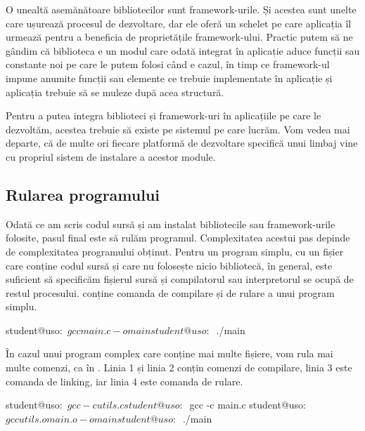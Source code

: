 O unealtă asemănătoare bibliotecilor sunt framework-urile. Și acestea sunt
unelte care ușurează procesul de dezvoltare, dar ele oferă un schelet pe care
aplicația îl urmează pentru a beneficia de proprietățile framework-ului. Practic
putem să ne gândim că biblioteca e un modul care odată integrat în aplicație
aduce funcții sau constante noi pe care le putem folosi când e cazul, în timp ce
framework-ul impune anumite funcții sau elemente ce trebuie implementate în
aplicație și aplicația trebuie să se muleze după acea structură.

Pentru a putea integra biblioteci și framework-uri în aplicațiile pe care le
dezvoltăm, acestea trebuie să existe pe sistemul pe care lucrăm. Vom vedea mai
departe, că de multe ori fiecare platformă de dezvoltare specifică unui limbaj
vine cu propriul sistem de instalare a acestor module.

\subsection{Rularea programului}
\label{sec:appdev:dev:run}

Odată ce am scris codul sursă și am instalat bibliotecile sau framework-urile
folosite, pasul final este să rulăm programul. Complexitatea acestui pas depinde
de complexitatea programului obținut. Pentru un program simplu, cu un fișier
care conține codul sursă și care nu folosește nicio bibliotecă, în general, este
suficient să specificăm fișierul sursă și compilatorul sau interpretorul se
ocupă de restul procesului.  conține comanda de compilare și de rulare a unui program simplu.

\begin{screen}[caption={Compilarea și rularea unui program simplu},label={lst:appdev:simple-compile}]
student@uso:~$ gcc main.c -o main
student@uso:~$ ./main
\end{screen}

În cazul unui program complex care conține mai multe fișiere, vom rula mai multe comenzi, ca în . Linia 1 și linia 2 conțin comenzi de compilare, linia 3 este comanda de linking, iar linia 4 este comanda de rulare.

\begin{screen}[caption={Compilarea și rularea unui program din mai multe surse},label={lst:appdev:multiple-compile}]
student@uso:~$ gcc -c utils.c
student@uso:~$ gcc -c main.c
student@uso:~$ gcc utils.o main.o -o main
student@uso:~$ ./main
\end{screen}

